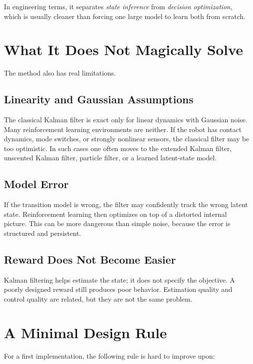 \documentclass[12pt,a4paper]{article}
\begin{document}
In engineering terms, it separates \emph{state inference} from \emph{decision optimization}, which is usually cleaner than forcing one large model to learn both from scratch.

\section{What It Does Not Magically Solve}

The method also has real limitations.

\subsection{Linearity and Gaussian Assumptions}

The classical Kalman filter is exact only for linear dynamics with Gaussian noise. Many reinforcement learning environments are neither. If the robot has contact dynamics, mode switches, or strongly nonlinear sensors, the classical filter may be too optimistic. In such cases one often moves to the extended Kalman filter, unscented Kalman filter, particle filter, or a learned latent-state model.

\subsection{Model Error}

If the transition model is wrong, the filter may confidently track the wrong latent state. Reinforcement learning then optimizes on top of a distorted internal picture. This can be more dangerous than simple noise, because the error is structured and persistent.

\subsection{Reward Does Not Become Easier}

Kalman filtering helps estimate the state; it does not specify the objective. A poorly designed reward still produces poor behavior. Estimation quality and control quality are related, but they are not the same problem.

\section{A Minimal Design Rule}

For a first implementation, the following rule is hard to improve upon:
\end{document}
